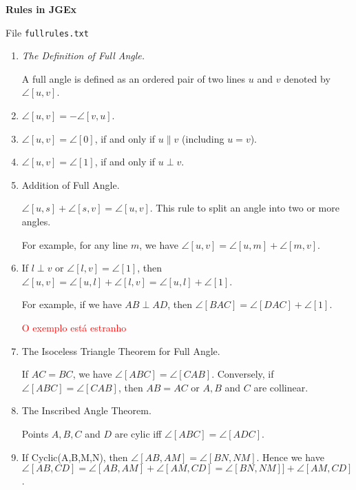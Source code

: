 \documentclass[a4paper,11pt]{article}
\begin{document}
\begin{center}
  \Large\bf Rules in JGEx
\end{center}

\bigskip

File \texttt{fullrules.txt}

\bigskip

\begin{enumerate}

\item \emph{The Definition of Full Angle.}

A full angle is defined as an ordered pair of two lines $u$ and $v$ denoted by $\angle[u,v]$.

\item $\angle[u,v] =  - \angle[v,u]$.

\item $\angle[u,v] = \angle[0]$, if and only if $u \| v$  (including $u = v$).

\item $\angle[u,v] = \angle[1]$,  if and only if $u\perp v$.

\item Addition of Full Angle.

  $\angle[u,s] + \angle[s,v] = \angle[u,v]$.  This rule to split an angle into two or more angles.

  For example, for any line $m$, we have  $\angle[u,v] =  \angle[u,m] +  \angle[m,v]$.

\item If $l \perp v$ or $\angle[l,v] = \angle[1]$, then
  $\angle[u,v] = \angle[u,l] + \angle[l,v] = \angle[u,l] + \angle[1]$.

  For example, if we have $AB \perp AD$, then  $\angle[BAC] = \angle[DAC] + \angle[1]$.

  \textcolor{red}{O exemplo está estranho}

\item The Isoceless Triangle Theorem for Full Angle.
  
 If $AC = BC$, we have $\angle[ABC] = \angle[CAB]$. Conversely, if
 $\angle[ABC] = \angle[CAB]$, then $AB = AC$ or $A, B$ and $C$ are collinear.

\item The Inscribed Angle Theorem.

  Points $A,B,C$ and $D$ are cylic iff $\angle[ABC] = \angle[ADC]$.

\item If Cyclic(A,B,M,N),  then $\angle[AB, AM] = \angle[BN,NM]$.  Hence we have  $\angle[AB, CD] = \angle[AB, AM] + \angle[AM, CD] = \angle[BN,NM]] + \angle[AM, CD]$.


\end{enumerate}
\end{document}
